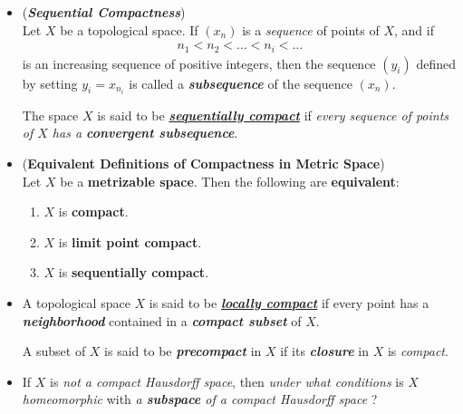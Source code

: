 \documentclass[11pt]{article}
\begin{document}
\begin{itemize}
\item \begin{definition} (\emph{\textbf{Sequential Compactness}})\\
Let $X$ be a topological space. If $(x_n)$ is a \emph{sequence} of points of $X$, and if
\begin{align*}
n_1 < n_2 < \ldots < n_i < \ldots
\end{align*}
is an increasing sequence of positive integers, then the sequence $(y_i)$ defined by setting $y_i = x_{n_i}$ is called a \emph{\textbf{subsequence}} of the sequence $(x_n)$. 

The space $X$ is said to be \underline{\emph{\textbf{sequentially compact}}} if \emph{every sequence of points of $X$ has a \textbf{convergent subsequence}}.
\end{definition}

\item \begin{theorem} (\textbf{Equivalent Definitions of Compactness in Metric Space}) \citep{munkres2000topology}\\
Let $X$ be a \textbf{metrizable space}. Then the following are \textbf{equivalent}:
\begin{enumerate}
\item $X$ is \textbf{compact}.
\item $X$ is \textbf{limit point compact}.
\item $X$ is \textbf{sequentially compact}.
\end{enumerate}
\end{theorem}

\item \begin{definition}
A topological space $X$ is said to be \underline{\emph{\textbf{locally compact}}} if every point has a \emph{\textbf{neighborhood}} contained in a \emph{\textbf{compact subset}} of $X$. 

A subset of $X$ is said to be \emph{\textbf{precompact}} in $X$ if its \emph{\textbf{closure}} in $X$ is \emph{compact}.
\end{definition}



\item If $X$ is \emph{not a compact Hausdorff space}, then \emph{under what conditions} is $X$ \emph{homeomorphic} with \emph{a \textbf{subspace} of a compact Hausdorff space} ?


\end{itemize}
\end{document}
